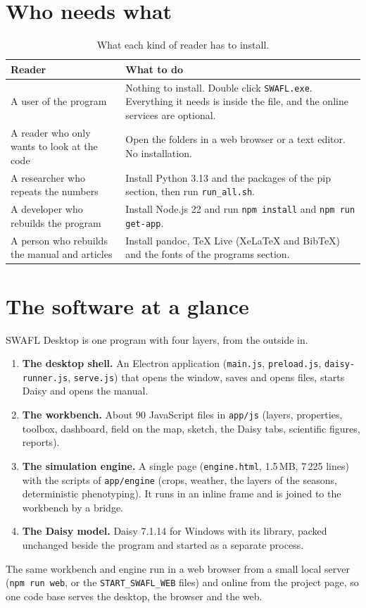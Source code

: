 \section{Who needs what}
\begin{table}[H]\centering\small
\caption{What each kind of reader has to install.}\label{tab:who}
\begin{tabular}{@{}>{\raggedright\arraybackslash}p{3.4cm}>{\raggedright\arraybackslash}p{9.6cm}@{}}
\toprule Reader & What to do\\\midrule
A user of the program & Nothing to install. Double click \texttt{SWAFL.exe}. Everything it needs is inside the file, and the online services are optional.\\
A reader who only wants to look at the code & Open the folders in a web browser or a text editor. No installation.\\
A researcher who repeats the numbers & Install Python 3.13 and the packages of the pip section, then run \texttt{run\_all.sh}.\\
A developer who rebuilds the program & Install Node.js 22 and run \texttt{npm install} and \texttt{npm run get-app}.\\
A person who rebuilds the manual and articles & Install pandoc, TeX Live (XeLaTeX and BibTeX) and the fonts of the programs section.\\
\bottomrule\end{tabular}\end{table}

\section{The software at a glance}
SWAFL Desktop is one program with four layers, from the outside in.
\begin{enumerate}[nosep,leftmargin=1.5em]
\item \textbf{The desktop shell.} An Electron application (\texttt{main.js}, \texttt{preload.js}, \texttt{daisy-runner.js}, \texttt{serve.js}) that opens the window, saves and opens files, starts Daisy and opens the manual.
\item \textbf{The workbench.} About 90 JavaScript files in \texttt{app/js} (layers, properties, toolbox, dashboard, field on the map, sketch, the Daisy tabs, scientific figures, reports).
\item \textbf{The simulation engine.} A single page (\texttt{engine.html}, 1.5\,MB, 7\,225 lines) with the scripts of \texttt{app/engine} (crops, weather, the layers of the seasons, deterministic phenotyping). It runs in an inline frame and is joined to the workbench by a bridge.
\item \textbf{The Daisy model.} Daisy 7.1.14 for Windows with its library, packed unchanged beside the program and started as a separate process.
\end{enumerate}
The same workbench and engine run in a web browser from a small local server (\texttt{npm run web}, or the \texttt{START\_SWAFL\_WEB} files) and online from the project page, so one code base serves the desktop, the browser and the web.

